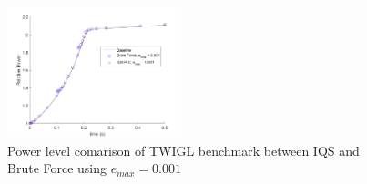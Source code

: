 \documentclass{anstrans}
\begin{document}
%

\begin{figure}[!htbp]
\centering
\includegraphics[width=0.45\textwidth]{TWIGL_power_plot.png}
\caption{Power level comarison of TWIGL benchmark between IQS and Brute Force using $e_{max} = 0.001$}
\label{fig:TWIGL_power}
\end{figure}
\end{document}
